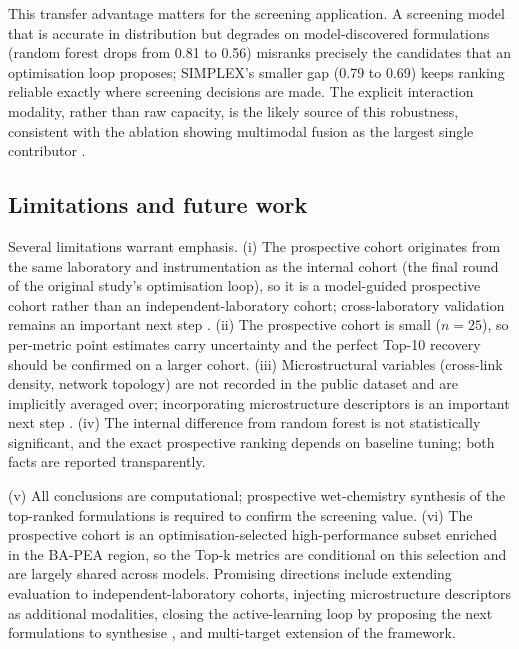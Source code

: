 \documentclass[utf8]{FrontiersinHarvard}
\begin{document}
This transfer advantage matters for the screening application. A screening model that is accurate in distribution but degrades on model-discovered formulations (random forest drops from 0.81 to 0.56) misranks precisely the candidates that an optimisation loop proposes; SIMPLEX's smaller gap (0.79 to 0.69) keeps ranking reliable exactly where screening decisions are made. The explicit interaction modality, rather than raw capacity, is the likely source of this robustness, consistent with the ablation showing multimodal fusion as the largest single contributor \cite{kim2023smallML,agrawal2016mlmaterials,isayev2017mlmaterials,ward2018mlcomposite,recent2022rao,recent2021mishin,recent2025li,recent2022shokrollah,recent2023kibrete}.

\subsection{Limitations and future work}

Several limitations warrant emphasis. (i) The prospective cohort originates from the same laboratory and instrumentation as the internal cohort (the final round of the original study's optimisation loop), so it is a model-guided prospective cohort rather than an independent-laboratory cohort; cross-laboratory validation remains an important next step \cite{liao2025nature}. (ii) The prospective cohort is small ($n = 25$), so per-metric point estimates carry uncertainty and the perfect Top-10 recovery should be confirmed on a larger cohort. (iii) Microstructural variables (cross-link density, network topology) are not recorded in the public dataset and are implicitly averaged over; incorporating microstructure descriptors is an important next step \cite{kim2023smallML,agrawal2016mlmaterials,isayev2017mlmaterials,zitnick2020materials}. (iv) The internal difference from random forest is not statistically significant, and the exact prospective ranking depends on baseline tuning; both facts are reported transparently.

(v) All conclusions are computational; prospective wet-chemistry synthesis of the top-ranked formulations is required to confirm the screening value. (vi) The prospective cohort is an optimisation-selected high-performance subset enriched in the BA-PEA region, so the Top-k metrics are conditional on this selection and are largely shared across models. Promising directions include extending evaluation to independent-laboratory cohorts, injecting microstructure descriptors as additional modalities, closing the active-learning loop by proposing the next formulations to synthesise \cite{chen2022activelearning}, and multi-target extension of the framework.
\end{document}
